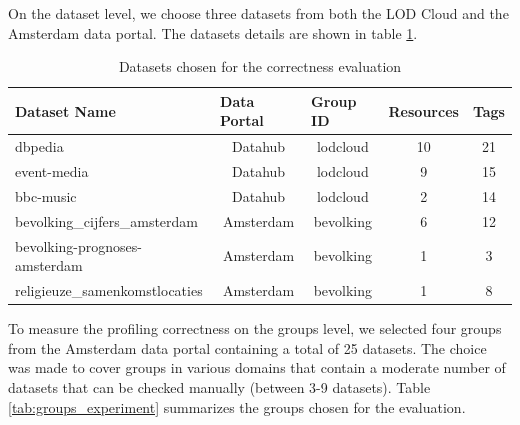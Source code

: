 \documentclass[runningheads,a4paper]{../../Util/LaTEX/llncs}
\begin{document}
On the dataset level, we choose three datasets from both the LOD Cloud and the Amsterdam data portal. The datasets details are shown in table \ref{tab:datases_experiment}.
\begin{table}[ht]
\centering
\footnotesize\setlength{\tabcolsep}{1.5pt}
\begin{tabular}{|l|c|c|c|c|}
\hline
\textbf{Dataset Name}          & \multicolumn{1}{l|}{\textbf{Data Portal}} & \multicolumn{1}{l|}{\textbf{Group ID}} & \multicolumn{1}{l|}{\textbf{Resources}} & \multicolumn{1}{l|}{\textbf{Tags}} \\ \hline
dbpedia                        & Datahub                                   & lodcloud                               & 10                                      & 21                                 \\ \hline
event-media                    & Datahub                                   & lodcloud                               & 9                                       & 15                                 \\ \hline
bbc-music                      & Datahub                                   & lodcloud                               & 2                                       & 14                                 \\ \hline
bevolking\_cijfers\_amsterdam  & Amsterdam                                 & bevolking                              & 6                                       & 12                                 \\ \hline
bevolking-prognoses-amsterdam  & Amsterdam                                 & bevolking                              & 1                                       & 3                                  \\ \hline
religieuze\_samenkomstlocaties & Amsterdam                                 & bevolking                              & 1                                       & 8                                  \\ \hline
\end{tabular}
\caption{Datasets chosen for the correctness evaluation}
\label{tab:datases_experiment}
\end{table}

To measure the profiling correctness on the groups level, we selected four groups from the Amsterdam data portal containing a total of 25 datasets. The choice was made to cover groups in various domains that contain a moderate number of datasets that can be checked manually (between 3-9 datasets). Table \ref{tab:groups_experiment} summarizes the groups chosen for the evaluation.
\end{document}
